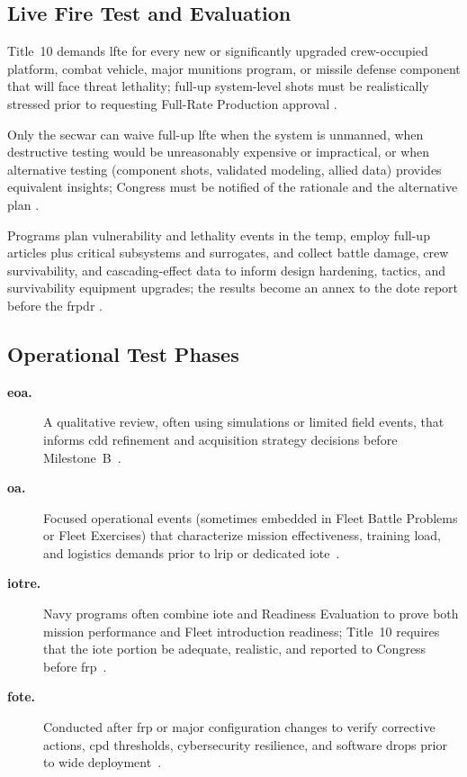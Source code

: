 \documentclass[../main.tex]{subfiles}
\begin{document}
\subsection{Live Fire Test and Evaluation}
\begin{description}[style=nextline,labelsep=0.5em,font=\bfseries]
  \item[\textbf{When required.}] Title~10 demands \ac{lfte} for every new or significantly upgraded crew-occupied platform, combat vehicle, major munitions program, or missile defense component that will face threat lethality; full-up system-level shots must be realistically stressed prior to requesting Full-Rate Production approval \autocite{USC-10-2366,DoDI5000-89}.
  \item[\textbf{When waived.}] Only the \ac{secwar} can waive full-up \ac{lfte} when the system is unmanned, when destructive testing would be unreasonably expensive or impractical, or when alternative testing (component shots, validated modeling, allied data) provides equivalent insights; Congress must be notified of the rationale and the alternative plan \autocite{USC-10-2366,DoDI5000-89}.
  \item[\textbf{Execution and use.}] Programs plan vulnerability and lethality events in the \ac{temp}, employ full-up articles plus critical subsystems and surrogates, and collect battle damage, crew survivability, and cascading-effect data to inform design hardening, tactics, and survivability equipment upgrades; the results become an annex to the \ac{dote} report before the \ac{frpdr} \autocite{DoDI5000-89,DoDI5000-85}.
\end{description}

\subsection{Operational Test Phases}
\begin{description}
	\item[\textbf{\ac{eoa}.}] A qualitative review, often using simulations or limited field events, that informs \ac{cdd} refinement and acquisition strategy decisions before Milestone~B~\autocite{edo-3-5-6-test-eval-part-ii-2025}.
	\item[\textbf{\ac{oa}.}] Focused operational events (sometimes embedded in Fleet Battle Problems or Fleet Exercises) that characterize mission effectiveness, training load, and logistics demands prior to \ac{lrip} or dedicated \ac{iote}~\autocite{edo-3-5-6-test-eval-part-ii-2025}.
	\item[\textbf{\ac{iotre}.}] Navy programs often combine \ac{iote} and Readiness Evaluation to prove both mission performance and Fleet introduction readiness; Title~10 requires that the \ac{iote} portion be adequate, realistic, and reported to Congress before \ac{frp}~\autocite{USC-10-2399}.
	\item[\textbf{\ac{fote}.}] Conducted after \ac{frp} or major configuration changes to verify corrective actions, \ac{cpd} thresholds, cybersecurity resilience, and software drops prior to wide deployment~\autocite{DoDI5000-89}.
\end{description}
\end{document}
